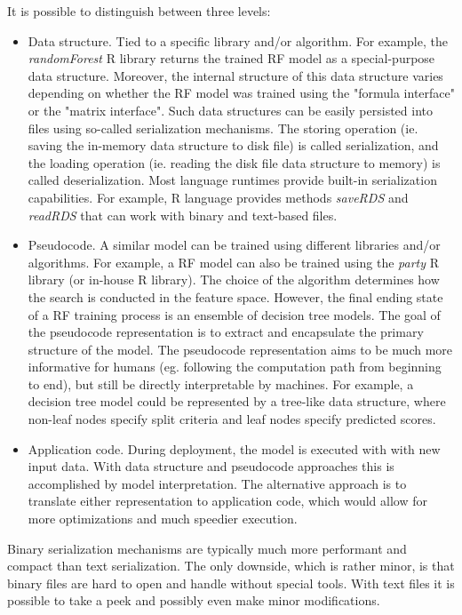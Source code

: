\documentclass[12pt,letterpaper]{article}
\begin{document}
It is possible to distinguish between three levels:
\begin{itemize}
  \item Data structure. Tied to a specific library and/or algorithm.
  For example, the \textit{randomForest} R library returns the trained
  RF model as a special-purpose data structure. Moreover, the internal
  structure of this data structure varies depending on whether the RF
  model was trained using the "formula interface" or the "matrix interface".
  Such data structures can be easily persisted into files using so-called
  serialization mechanisms. The storing operation (ie. saving the in-memory
  data structure to disk file) is called serialization, and the loading
  operation (ie. reading the disk file data structure to memory) is called
  deserialization. Most language runtimes provide built-in serialization
  capabilities. For example, R language provides methods \textit{saveRDS}
  and \textit{readRDS} that can work with binary and text-based files.
  \item Pseudocode. A similar model can be trained using different libraries
  and/or algorithms. For example, a RF model can also be trained using
  the \textit{party} R library (or in-house R library). The choice of the
  algorithm determines how the search is conducted in the feature space. 
  However, the final ending state of a RF training process is an ensemble
  of decision tree models.
  The goal of the pseudocode representation is to extract and encapsulate
  the primary structure of the model. The pseudocode representation aims 
  to be much more informative for humans (eg. following the computation
  path from beginning to end), but still be directly interpretable by 
  machines. For example, a decision tree model could be represented by
  a tree-like data structure, where non-leaf nodes specify split criteria 
  and leaf nodes specify predicted scores.
  \item Application code. During deployment, the model is executed with
  with new input data. With data structure and pseudocode approaches this 
  is accomplished by model interpretation. The alternative approach is to
  translate either representation to application code, which would allow
  for more optimizations and much speedier execution. 
\end{itemize}

Binary serialization mechanisms are typically much more performant and 
compact than text serialization. The only downside, which is rather minor,
is that binary files are hard to open and handle without special tools.
With text files it is possible to take a peek and possibly even make minor
modifications.
\end{document}

